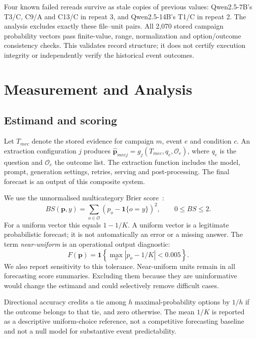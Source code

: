 \documentclass[10pt,conference]{IEEEtran}
\begin{document}
Four known failed rereads survive as stale copies of previous values:
Qwen2.5-7B's T3/C, C9/A and C13/C in repeat 3, and Qwen2.5-14B's T1/C
in repeat 2. The analysis excludes exactly these file--unit pairs.
All 2,070 stored campaign probability vectors pass finite-value, range,
normalization and option/outcome consistency checks. This validates
record structure; it does not certify execution integrity or independently
verify the historical event outcomes.

\section{Measurement and Analysis}
\label{sec:methods}
\subsection{Estimand and scoring}
Let $T_{mec}$ denote the stored evidence for campaign $m$, event $e$ and
condition $c$. An extraction configuration $j$ produces
$\widehat{\mathbf p}_{mecj}=g_j(T_{mec},q_e,\mathcal O_e)$, where $q_e$ is the
question and $\mathcal O_e$ the outcome list. The extraction function includes
the model, prompt, generation settings, retries, serving and post-processing.
The final forecast is an output of this composite system.

We use the unnormalised multicategory Brier score~\cite{brier1950,gneiting2007}:
\begin{equation}
 BS(\mathbf p,y)=\sum_{o\in\mathcal O}
       (p_o-\mathbf 1\{o=y\})^2,\qquad 0\leq BS\leq 2.
\end{equation}
For a uniform vector this equals $1-1/K$. A uniform vector is a legitimate
probabilistic forecast; it is not automatically an error or a missing answer.
The term \emph{near-uniform} is an operational output diagnostic:
\begin{equation}
 F(\mathbf p)=\mathbf 1\left\{\max_o |p_o-1/K|<0.005\right\}.
\end{equation}
We also report sensitivity to this tolerance. Near-uniform units remain in all
forecasting score summaries. Excluding them because they are uninformative
would change the estimand and could selectively remove difficult cases.

Directional accuracy credits a tie among $h$ maximal-probability options by
$1/h$ if the outcome belongs to that tie, and zero otherwise. The mean
$1/K$ is reported as a descriptive uniform-choice reference, not a competitive
forecasting baseline and not a null model for substantive event predictability.
\end{document}
